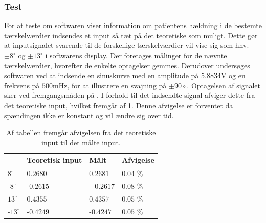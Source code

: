 \subsubsection{Test}
For at teste om softwaren viser information om patientens hældning i de bestemte tærskelværdier indsendes et input så tæt på det teoretiske som muligt. Dette gør at inputsignalet svarende til de forskellige tærskelværdier vil vise sig som hhv. $\pm 8^{\circ}$ og $\pm 13^{\circ}$ i softwarens display. Der foretages målinger for de nævnte tærskelværdier, hvorefter de enkelte optagelser gemmes.
Derudover undersøges softwaren ved at indsende en sinuskurve med en amplitude på $5.8834$V og en frekvens på $500$mHz, for at illustrere en svajning på $\pm 90{\circ}$. Optagelsen af signalet sker ved fremgangsmåden på . I forhold til det indsendte signal afviger dette fra det teoretiske input, hvilket fremgår af \ref{Tab:afvigelse_software}. Denne afvigelse er forventet da spændingen ikke er konstant og vil ændre sig over tid. 

\begin{table}[]
\centering
\caption{Af tabellen fremgår afvigelsen fra det teoretiske input til det målte input.}
\label{Tab:afvigelse_software}
\begin{tabular}{llll}
             & Teoretisk input & Målt 	& Afvigelse \\ \hline
$8^{\circ}$   & $0.2680$          & $0.2681$  & $0.04$ \% \\ \hline
-$8^{\circ}$   & -$0.2615$         & $-0.2617$ & $0.08$ \%  \\ \hline
$13^{\circ}$  & $0.4355$          & $0.4357$  & $0.05$ \% \\ \hline
-$13^{\circ}$ & -$0.4249$         & -$0.4247$ & $0.05$ \% \\ \hline    
\end{tabular}
\end{table}

